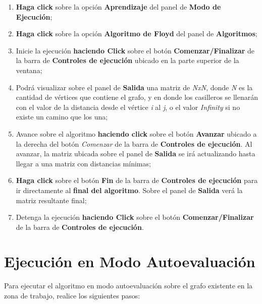 \documentclass{book}
\begin{document}
\begin{enumerate}
	\itemsep=8pt \topsep=0pt \partopsep=0pt \parskip=0pt \parsep=0pt

	\item \textbf{Haga click} sobre la opción \textbf{Aprendizaje} del panel de \textbf{Modo de Ejecución};

	\item \textbf{Haga click} sobre la opción \textbf{Algoritmo de Floyd} del panel de \textbf{Algoritmos};

	\item Inicie la ejecución \textbf{haciendo Click} sobre el botón \textbf{Comenzar/Finalizar} de la barra de \textbf{Controles de ejecución} ubicado en la parte superior de la ventana;

	\item Podrá visualizar sobre el panel de \textbf{Salida} una matriz de \textit{NxN}, donde \textit{N} es la cantidad de vértices que contiene el grafo, y en donde los casilleros se llenarán con el valor de la distancia desde el vértice \textit{i} al \textit{j}, o el valor \textit{Infinity} si no existe un camino que los una; 

	\item Avance sobre el algoritmo \textbf{haciendo click} sobre el botón \textbf{Avanzar} ubicado a la derecha del botón \textit{Comenzar} de la barra de \textbf{Controles de ejecución}. Al avanzar, la matriz ubicada sobre el panel de \textbf{Salida} se irá actualizando hasta llegar a una matriz con distancias mínimas;

	\item \textbf{Haga click} sobre el botón \textbf{Fin} de la barra de \textbf{Controles de ejecución} para ir directamente al \textbf{final del algoritmo}. Sobre el panel de \textbf{Salida} verá la matriz resultante final;

	\item Detenga la ejecución \textbf{haciendo Click} sobre el botón \textbf{Comenzar/Finalizar} de la barra de \textbf{Controles de ejecución}.

\end{enumerate}
\medskip



\section{Ejecución en Modo Autoevaluación}

Para ejecutar el algoritmo en modo autoevaluación sobre el grafo existente en la zona de trabajo, realice los siguientes pasos:
\medskip
\end{document}
